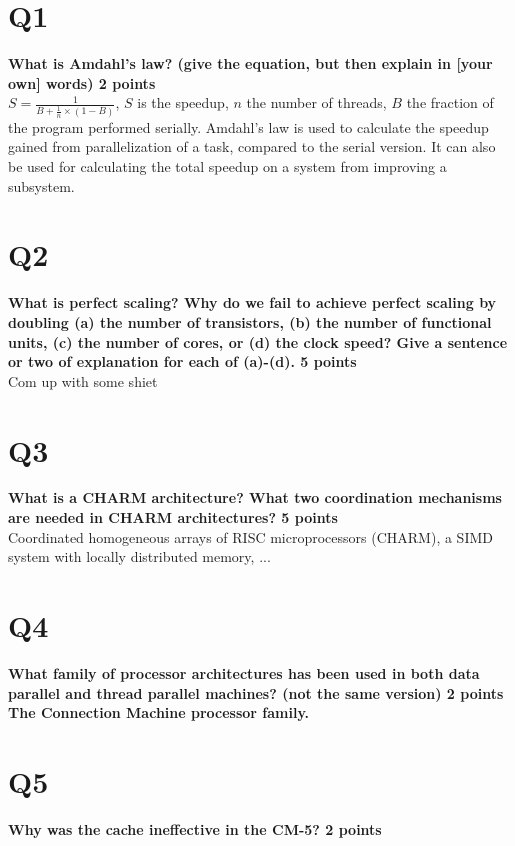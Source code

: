 \documentclass[a4paper]{article}
\begin{document}

\section*{Q1}
\large{\textbf{What is Amdahl’s law? (give the equation, but then explain in [your own]     words) 2 points\\}}
$S=\frac{1}{B + \frac{1}{n}\times(1-B)}$, $S$ is the speedup, $n$ the number of threads, $B$ the fraction of the program performed serially. Amdahl’s law is used to calculate the speedup gained from parallelization of a task, compared to the serial version. It can also be used for calculating the total speedup on a system from improving a subsystem.

\section*{Q2}
\large{\textbf{What is perfect scaling? Why do we fail to achieve perfect scaling     by doubling (a) the number of transistors, (b) the number of functional units, (c) the number of cores, or (d) the clock speed? Give a sentence or two of explanation for each of (a)-(d). 5 points\\}}
Com up with some shiet

\section*{Q3}
\large{\textbf{
What is a CHARM architecture? What two coordination mechanisms are needed in CHARM architectures? 5 points\\}}
Coordinated homogeneous arrays of RISC microprocessors (CHARM), a SIMD system with locally distributed memory, ...

\section*{Q4}
\large{\textbf{
What family of processor architectures has been used in both data parallel and thread parallel machines? (not the same version) 2 points
The Connection Machine processor family. \\}}

\section*{Q5}
\large{\textbf{
Why was the cache ineffective in the CM-5? 2 points\\}}
\end{document}
